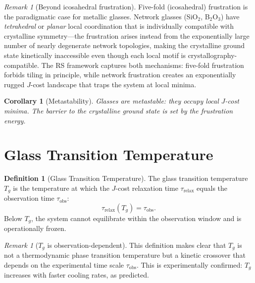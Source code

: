 \documentclass[12pt,a4paper]{article}
\newtheorem{corollary}[theorem]{Corollary}
\theoremstyle{definition}
\newtheorem{definition}[theorem]{Definition}
\theoremstyle{remark}
\newtheorem{remark}[theorem]{Remark}
\begin{document}
\begin{remark}[Beyond icosahedral frustration]
Five-fold (icosahedral) frustration is the paradigmatic case for
metallic glasses.  Network glasses (SiO$_2$, B$_2$O$_3$) have
\emph{tetrahedral} or \emph{planar} local coordination that is
individually compatible with crystalline symmetry---the frustration
arises instead from the exponentially large number of nearly degenerate
network topologies, making the crystalline ground state kinetically
inaccessible even though each local motif is crystallography-compatible.
The RS framework captures both mechanisms: five-fold frustration forbids
tiling in principle, while network frustration creates an exponentially
rugged $J$-cost landscape that traps the system at local minima.
\end{remark}

\begin{corollary}[Metastability]
Glasses are metastable: they occupy local $J$-cost minima.  The
barrier to the crystalline ground state is set by the frustration
energy.
\end{corollary}

\section{Glass Transition Temperature}
\label{sec:tg}

\begin{definition}[Glass Transition Temperature]
\label{thm:tg}
The glass transition temperature $T_g$ is the temperature at which
the $J$-cost relaxation time $\tau_{\mathrm{relax}}$ equals the
observation time $\tau_{\mathrm{obs}}$:
\begin{equation}
  \tau_{\mathrm{relax}}(T_g) = \tau_{\mathrm{obs}}.
\end{equation}
Below $T_g$, the system cannot equilibrate within the observation
window and is operationally frozen.
\end{definition}

\begin{remark}[$T_g$ is observation-dependent]
This definition makes clear that $T_g$ is not a thermodynamic phase
transition temperature but a kinetic crossover that depends on the
experimental time scale $\tau_{\mathrm{obs}}$.  This is experimentally
confirmed: $T_g$ increases with faster cooling rates, as predicted.
\end{remark}
\end{document}
